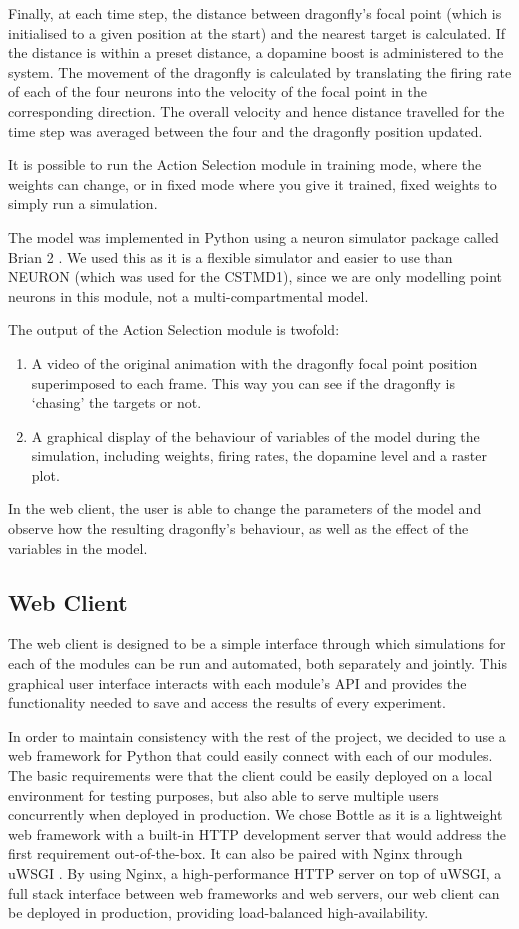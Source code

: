 \documentclass[a4paper,11pt]{article}
\begin{document}
Finally, at each time step, the distance between dragonfly's focal point (which is initialised to a given position at the start) and the nearest target is calculated. If the distance is within a preset distance, a dopamine boost is administered to the system. The movement of the dragonfly is calculated by translating the firing rate of each of the four neurons into the velocity of the focal point in the corresponding direction. The overall velocity and hence distance travelled for the time step was averaged between the four and the dragonfly position updated. 

It is possible to run the Action Selection module in training mode, where the weights can change, or in fixed mode where you give it trained, fixed weights to simply run a simulation. 

The model was implemented in Python using a neuron simulator package called Brian 2 \cite{brian}. We used this as it is a flexible simulator and easier to use than NEURON (which was used for the CSTMD1), since we are only modelling point neurons in this module, not a multi-compartmental model. 

The output of the Action Selection module is twofold:
\begin{enumerate}
\item A video of the original animation with the dragonfly focal point position superimposed to each frame. This way you can see if the dragonfly is `chasing' the targets or not.
\item A graphical display of the behaviour of variables of the model during the simulation, including weights, firing rates, the dopamine level and a raster plot.
\end{enumerate}
In the web client, the user is able to change the parameters of the model and observe how the resulting dragonfly's behaviour, as well as the effect of the variables in the model.

\subsection{Web Client}
The web client is designed to be a simple interface through which simulations for each of the modules can be run and automated, both separately and jointly. This graphical user interface interacts with each module's API and provides the functionality needed to save and access the results of every experiment.

In order to maintain consistency with the rest of the project, we decided to use a web framework for Python that could easily connect with each of our modules. The basic requirements were that the client could be easily deployed on a local environment for testing purposes, but also able to serve multiple users concurrently when deployed in production. We chose Bottle \cite{bottle} as it is a lightweight web framework with a built-in HTTP development server that would address the first requirement out-of-the-box. It can also be paired with Nginx \cite{nginx} through uWSGI \cite{uwsgi}. By using Nginx, a high-performance HTTP server on top of uWSGI, a full stack interface between web frameworks and web servers, our web client can be deployed in production, providing load-balanced high-availability.
\end{document}
